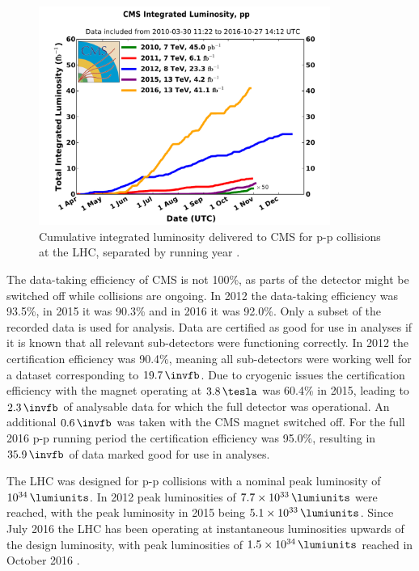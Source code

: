 \begin{figure}[h!]
\includegraphics[width=0.85\textwidth]{./Detector/Plots/int_lumi_cumulative_pp_2.pdf}
\caption[Cumulative integrated luminosity delivered to CMS
for p-p collisions at the LHC, separated by running year.]{Cumulative integrated luminosity delivered to \ac{CMS} for p-p collisions at the \ac{LHC}, separated
by running year \cite{cms-lumi-public}.}
\label{fig:CMSLHC_intlumi}
\end{figure}

The data-taking efficiency of CMS is not 100\%, as parts of the detector might be
switched off while collisions are ongoing. In 2012 the data-taking 
efficiency was 93.5\%, in 2015 it was 90.3\% and in 2016 it was 92.0\%.
Only a subset of the recorded data is used for analysis.
Data are
certified as good for use in analyses if it is known that all relevant sub-detectors
were functioning correctly. In 2012 the certification efficiency was 90.4\%, 
meaning all sub-detectors were working well for a dataset corresponding to $19.7\,\invfb$. %
Due to cryogenic issues the certification efficiency with the magnet operating
at $3.8\,\tesla$ was 60.4\% in 2015, leading to $2.3\,\invfb$ of 
analysable data for which the full detector was operational. An additional $0.6\,\invfb$
was taken with the \ac{CMS} magnet switched off. For the full 2016 p-p running period
the certification efficiency was 95.0\%, resulting in $35.9\,\invfb$ of data marked good %
for use in analyses.

The \ac{LHC} was designed for p-p collisions with a nominal
peak luminosity of $10^{34}\,\lumiunits$. In 2012 peak
luminosities of $7.7\times 10^{33}\,\lumiunits$ were reached, with the peak luminosity in
2015 being $5.1\times 10^{33}\,\lumiunits$. Since July 2016
the \ac{LHC} has been operating at instantaneous luminosities upwards of the 
design luminosity, with peak luminosities of $1.5\times10^{34}\,\lumiunits$ reached
in October 2016 \cite{cms-lumi-public}.

